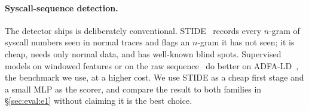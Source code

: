 \paragraph{Syscall-sequence detection.}
The detector \sys ships is deliberately conventional. STIDE~\cite{stide}
records every $n$-gram of syscall numbers seen in normal traces and flags
an $n$-gram it has not seen; it is cheap, needs only normal data, and has
well-known blind spots. Supervised models on windowed features or on the raw
sequence~\cite{creech,kim-lstm} do better on ADFA-LD~\cite{adfa-ld}, the
benchmark we use, at a higher cost. We use STIDE as a cheap first stage
and a small MLP as the scorer, and compare the result to both families in
\S\ref{sec:eval:e1} without claiming it is the best choice.
